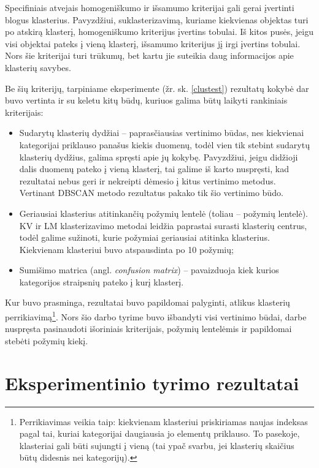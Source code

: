 \documentclass{VUMIFInfBakalaurinis}
\begin{document}
Specifiniais atvejais homogeniškumo ir išsamumo kriterijai gali gerai
įvertinti blogus klasterius. Pavyzdžiui, suklasterizavimą, kuriame
kiekvienas objektas turi po atskirą klasterį, homogeniškumo kriterijus
įvertins tobulai. Iš kitos pusės, jeigu visi objektai pateks į vieną
klasterį, išsamumo kriterijus jį irgi įvertins tobulai. Nors šie
kriterijai turi trūkumų, bet kartu jie suteikia daug informacijos apie
klasterių savybes.

Be šių kriterijų, tarpiniame eksperimente (žr. sk. \ref{clustest}) rezultatų kokybė dar buvo vertinta ir su keletu
kitų būdų, kuriuos galima būtų laikyti rankiniais kriterijais:

\begin{itemize}
\item
  Sudarytų klasterių dydžiai -- paprasčiausias vertinimo būdas, nes
  kiekvienai kategorijai priklauso panašus kiekis duomenų, todėl vien
  tik stebint sudarytų klasterių dydžius, galima spręsti apie jų kokybę.
  Pavyzdžiui, jeigu didžioji dalis duomenų pateko į vieną klasterį, tai
  galime iš karto nuspręsti, kad rezultatai nebus geri ir nekreipti
  dėmesio į kitus vertinimo metodus. Vertinant DBSCAN metodo rezultatus
  pakako tik šio vertinimo būdo.
\item
  Geriausiai klasterius atitinkančių požymių lentelė (toliau -- požymių
  lentelė). KV ir LM klasterizavimo metodai leidžia paprastai surasti
  klasterių centrus, todėl galime sužinoti, kurie požymiai geriausiai
  atitinka klasterius. Kiekvienam klasteriui buvo atspausdinta po 10
  požymių;
\item
  Sumišimo matrica (angl. \emph{confusion matrix}) -- pavaizduoja kiek
  kurios kategorijos straipsnių pateko į kurį klasterį.
\end{itemize}

Kur buvo prasminga, rezultatai buvo papildomai palyginti, atlikus
klasterių perrikiavimą\footnote{Perrikiavimas veikia taip: kiekvienam
  klasteriui priskiriamas naujas indeksas pagal tai, kuriai kategorijai
  daugiausia jo elementų priklauso. To pasekoje, klasteriai gali būti
  sujungti į vieną (tai ypač svarbu, jei klasterių skaičius būtų
  didesnis nei kategorijų).}. Nors šio darbo tyrime buvo išbandyti visi
vertinimo būdai, darbe nuspręsta pasinaudoti išoriniais kriterijais,
požymių lentelėmis ir papildomai stebėti požymių kiekį.

\section{Eksperimentinio tyrimo rezultatai}
\end{document}
